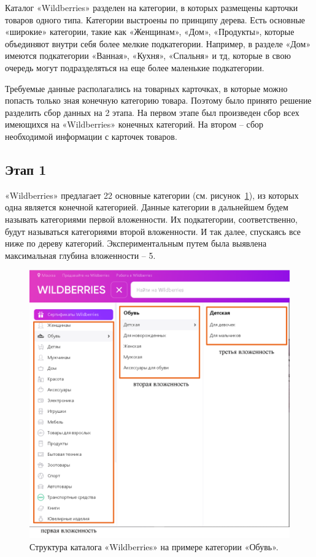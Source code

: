 \documentclass[a4paper,12pt]{extarticle}
\begin{document}
Каталог «Wildberries» разделен на категории, в которых размещены карточки товаров одного типа. Категории выстроены по принципу дерева. Есть основные «широкие» категории, такие как «Женщинам», «Дом», «Продукты», которые объединяют внутри себя более мелкие подкатегории. Например, в разделе «Дом» имеются подкатегории «Ванная», «Кухня», «Спальня» и тд, которые в свою очередь могут подразделяться на еще более маленькие подкатегории. 

Требуемые данные располагались на товарных карточках, в которые можно попасть только зная конечную категорию товара. Поэтому было принято решение разделить сбор данных на 2 этапа. На первом этапе был произведен сбор всех имеющихся на «Wildberries» конечных категорий. На втором – сбор необходимой информации с карточек товаров.

\subsection{Этап 1}\label{subsection:datastep1}

«Wildberries» предлагает 22 основные категории (см. рисунок~\ref{fig:wildberries1}), из которых одна является конечной категорией. Данные категории в дальнейшем будем называть категориями первой вложенности. Их подкатегории, соответственно, будут называться категориями второй вложенности. И так далее, спускаясь все ниже по дереву категорий. Экспериментальным путем была выявлена максимальная глубина вложенности – 5.

\begin{figure}[hbtp]
	\centering
	\includegraphics[scale=0.8]{wildberries1.png}
	\caption{Структура каталога «Wildberries» на примере категории «Обувь».}
	\label{fig:wildberries1}
\end{figure} 
\end{document}
